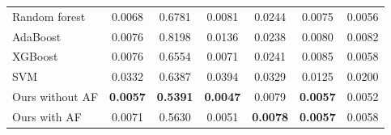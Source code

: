 ﻿\documentclass{ieeeaccess}
\begin{document}
\begin{table}[t]
\begin{tabular*}{0.9\textwidth}{c @{\extracolsep{\fill}} ccccccc}
    \hline

    \multicolumn{2}{l}{Random forest} & 0.0068 & 0.6781 & 0.0081 & 0.0244 & 0.0075 & 0.0056 \\
    \multicolumn{2}{l}{AdaBoost} & 0.0076 & 0.8198 & 0.0136 & 0.0238 & 0.0080 & 0.0082 \\
    \multicolumn{2}{l}{XGBoost} & 0.0076 & 0.6554 & 0.0071 & 0.0241 & 0.0085 & 0.0058 \\
    \multicolumn{2}{l}{SVM} & 0.0332 & 0.6387 & 0.0394 & 0.0329 & 0.0125 & 0.0200 \\

    \hline
    \hline

    \multicolumn{2}{l}{Ours without AF}        & \textbf{0.0057}          & \textbf{0.5391}          & \textbf{0.0047}          & 0.0079          & \textbf{0.0057}          & 0.0052 \\
    \multicolumn{2}{l}{Ours with AF}           & 0.0071                   & 0.5630                   & 0.0051                   & \textbf{0.0078} & \textbf{0.0057}          & 0.0058 \\

    \hline

  \end{tabular*}
  \label{table:comparison-rmse}
\end{table}
\end{document}
